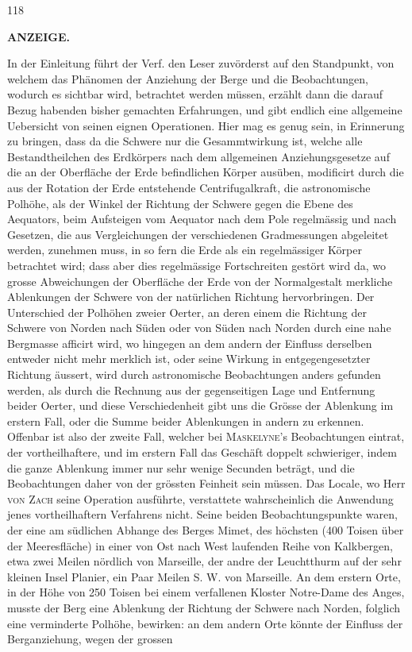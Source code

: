 \par
\vfill
{}\hfill{\small 118}\hspace*{.18\textwidth}\par
\clearpage
{}
\noindent{}%
\parbox[b]{\dimexpr\textwidth-20mm\relax}{\centering\small\textbf{ANZEIGE.}}%
\makebox[10mm][r]{}\par\nobreak\medskip
In der Einleitung führt der Verf. den Leser zuvörderst auf den Standpunkt, von welchem das Phänomen der Anziehung der Berge und die Beobachtungen, wodurch es sichtbar wird, betrachtet werden müssen, erzählt dann die darauf Bezug habenden bisher gemachten Erfahrungen, und gibt endlich eine allgemeine Uebersicht von seinen eignen Operationen. Hier mag es genug sein, in Erinnerung zu bringen, dass da die Schwere nur die Gesammtwirkung ist, welche alle Bestandtheilchen des Erdkörpers nach dem allgemeinen Anziehungsgesetze auf die an der Oberfläche der Erde befindlichen Körper ausüben, modificirt durch die aus der Rotation der Erde entstehende Centrifugalkraft, die astronomische Polhöhe, als der Winkel der Richtung der Schwere gegen die Ebene des Aequators, beim Aufsteigen vom Aequator nach dem Pole regelmässig und nach Gesetzen, die aus Vergleichungen der verschiedenen Gradmessungen abgeleitet werden, zunehmen muss, in so fern die Erde als ein regelmässiger Körper betrachtet wird; dass aber dies regelmässige Fortschreiten gestört wird da, wo grosse Abweichungen der Oberfläche der Erde von der Normalgestalt merkliche Ablenkungen der Schwere von der natürlichen Richtung hervorbringen. Der Unterschied der Polhöhen zweier Oerter, an deren einem die Richtung der Schwere von Norden nach Süden oder von Süden nach Norden durch eine nahe Bergmasse afficirt wird, wo hingegen an dem andern der Einfluss derselben entweder nicht mehr merklich ist, oder seine Wirkung in entgegengesetzter Richtung äussert, wird durch astronomische Beobachtungen anders gefunden werden, als durch die Rechnung aus der gegenseitigen Lage und Entfernung beider Oerter, und diese Verschiedenheit gibt uns die Grösse der Ablenkung im erstern Fall, oder die Summe beider Ablenkungen in andern zu erkennen. Offenbar ist also der zweite Fall, welcher bei \textsc{Maskelyne}'s Beobachtungen eintrat, der vortheilhaftere, und im erstern Fall das Geschäft doppelt schwieriger, indem die ganze Ablenkung immer nur sehr wenige Secunden beträgt, und die Beobachtungen daher von der grössten Feinheit sein müssen. Das Locale, wo Herr \textsc{von Zach} seine Operation ausführte, verstattete wahrscheinlich die Anwendung jenes vortheilhaftern Verfahrens nicht. Seine beiden Beobachtungspunkte waren, der eine am südlichen Abhange des Berges Mimet, des höchsten (400 Toisen über der Meeresfläche) in einer von Ost nach West laufenden Reihe von Kalkbergen, etwa zwei Meilen nördlich von Marseille, der andre der Leuchtthurm auf der sehr kleinen Insel Planier, ein Paar Meilen S. W. von Marseille. An dem erstern Orte, in der Höhe von 250 Toisen bei einem verfallenen Kloster Notre-Dame des Anges, musste der Berg eine Ablenkung der Richtung der Schwere nach Norden, folglich eine verminderte Polhöhe, bewirken: an dem andern Orte könnte der Einfluss der Berganziehung, wegen der grossen 